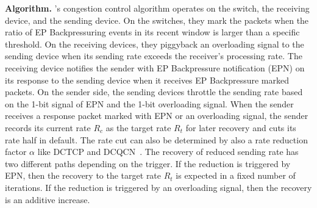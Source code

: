 \noindent \textbf{Algorithm.}
\aurelia's congestion control algorithm operates on the switch, the receiving device, and the sending device.
%
On the switches, they mark the packets when the ratio of EP Backpressuring events in its recent window is larger than a specific threshold.
%
On the receiving devices, they piggyback an overloading signal to the sending device when its sending rate exceeds the receiver's processing rate.
%
The receiving device notifies the sender with EP Backpressure notification (EPN) on its response to the sending device when it receives EP Backpressure marked packets.  
%
On the sender side, the sending devices throttle the sending rate based on the 1-bit signal of EPN and the 1-bit overloading signal. 
%
When the sender receives a response packet marked with EPN or an overloading signal, the sender records its current rate $R_{c}$ as the target rate $R_{t}$ for later recovery and cuts its rate half in default. 
%
The rate cut can also be determined by also a rate reduction factor $\alpha$ like DCTCP and DCQCN~\cite{dcqcn:sigcomm:2015}.         
%
The recovery of reduced sending rate has two different paths depending on the trigger.
%
If the reduction is triggered by EPN, then the recovery to the target rate $R_{t}$ is expected in a fixed number of iterations. 
%  
If the reduction is triggered by an overloading signal, then the recovery is an additive increase.

%


